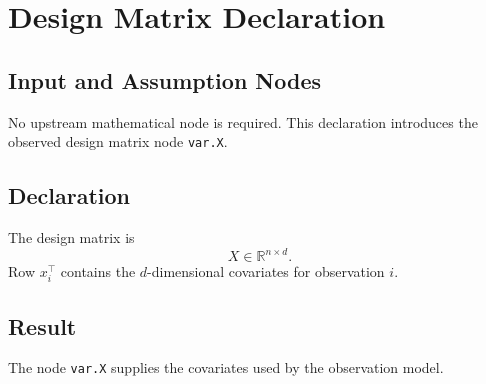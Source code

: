 \section{Design Matrix Declaration}
\label{def:design-matrix}

\subsection{Input and Assumption Nodes}
No upstream mathematical node is required. This declaration introduces the observed design matrix node \texttt{var.X}.

\subsection{Declaration}
The design matrix is
\[
  X \in \mathbb{R}^{n \times d}.
\]
Row \(x_i^\top\) contains the \(d\)-dimensional covariates for observation \(i\).

\subsection{Result}
The node \texttt{var.X} supplies the covariates used by the observation model.

